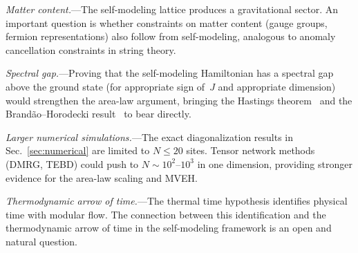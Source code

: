 \emph{Matter content.}---The self-modeling lattice produces a gravitational
sector.  An important question is whether constraints on matter content
(gauge groups, fermion representations) also follow from self-modeling,
analogous to anomaly cancellation constraints in string theory.

\emph{Spectral gap.}---Proving that the self-modeling Hamiltonian has a
spectral gap above the ground state (for appropriate sign of~$J$ and
appropriate dimension) would strengthen the area-law argument, bringing
the Hastings theorem~\cite{Hastings2007} and the Brand\~ao--Horodecki
result~\cite{BrandaoHorodecki2013} to bear directly.

\emph{Larger numerical simulations.}---The exact diagonalization results
in Sec.~\ref{sec:numerical} are limited to $N \leq 20$ sites.  Tensor
network methods (DMRG, TEBD) could push to $N \sim 10^2$--$10^3$ in one
dimension, providing stronger evidence for the area-law scaling and MVEH.

\emph{Thermodynamic arrow of time.}---The thermal time hypothesis
identifies physical time with modular flow.  The connection between this
identification and the thermodynamic arrow of time in the self-modeling
framework is an open and natural question.
